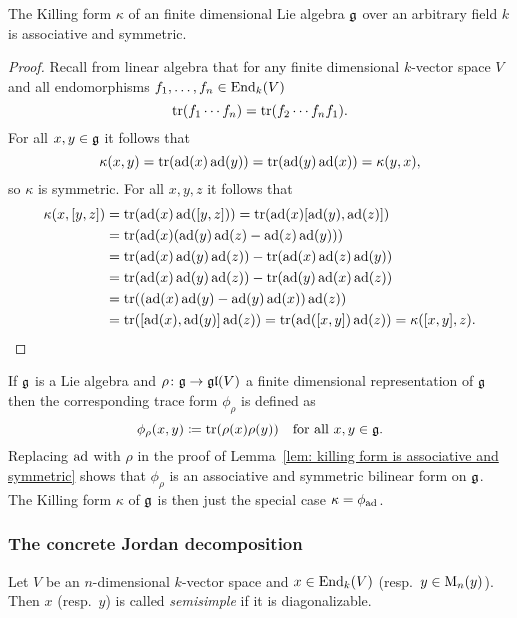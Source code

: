 \begin{lem}\label{lem: killing form is associative and symmetric}
 The Killing form $\kappa$ of an finite dimensional Lie algebra $\mathfrak{g}$ over an arbitrary field $k$ is associative and symmetric.
\end{lem}
\begin{proof}
 Recall from linear algebra that for any finite dimensional $k$-vector space $V$ and all endomorphisms $f_1, \dotsc, f_n \in \operatorname{End}_k(V)$
 \[
  \operatorname{tr}(f_1 \dotsm f_n) = \operatorname{tr}(f_2 \dotsm f_n f_1).
 \]
 For all $x,y \in \mathfrak{g}$ it follows that
 \[
  \kappa(x,y) = \operatorname{tr}(\operatorname{ad}(x) \operatorname{ad}(y)) = \operatorname{tr}(\operatorname{ad}(y) \operatorname{ad}(x)) = \kappa(y,x),
 \]
 so $\kappa$ is symmetric. For all $x,y,z$ it follows that
 \begin{align*}
  \kappa(x,[y,z])
  &= \operatorname{tr}(\operatorname{ad}(x) \operatorname{ad}([y,z]))
  = \operatorname{tr}(\operatorname{ad}(x) [\operatorname{ad}(y), \operatorname{ad}(z)]) \\
  &= \operatorname{tr}(\operatorname{ad}(x) (\operatorname{ad}(y) \operatorname{ad}(z) - \operatorname{ad}(z) \operatorname{ad}(y))) \\
  &= \operatorname{tr}(\operatorname{ad}(x) \operatorname{ad}(y) \operatorname{ad}(z)) - \operatorname{tr}(\operatorname{ad}(x) \operatorname{ad}(z) \operatorname{ad}(y)) \\
  &= \operatorname{tr}(\operatorname{ad}(x) \operatorname{ad}(y) \operatorname{ad}(z)) - \operatorname{tr}(\operatorname{ad}(y) \operatorname{ad}(x) \operatorname{ad}(z)) \\
  &= \operatorname{tr}((\operatorname{ad}(x) \operatorname{ad}(y)- \operatorname{ad}(y) \operatorname{ad}(x)) \operatorname{ad}(z)) \\
  &= \operatorname{tr}([\operatorname{ad}(x), \operatorname{ad}(y)] \operatorname{ad}(z))
  = \operatorname{tr}(\operatorname{ad}([x,y]) \operatorname{ad}(z))
  = \kappa([x,y],z).
 \qedhere
 \end{align*}
\end{proof}


\begin{rem}
 If $\mathfrak{g}$ is a Lie algebra and $\rho \colon \mathfrak{g} \to \mathfrak{gl}(V)$ a finite dimensional representation of $\mathfrak{g}$ then the corresponding trace form $\phi_\rho$ is defined as
 \[
  \phi_\rho(x,y) \coloneqq \operatorname{tr}(\rho(x) \rho(y)) \quad \text{for all $x,y \in \mathfrak{g}$}.
 \]
 Replacing $\operatorname{ad}$ with $\rho$ in the proof of Lemma~\ref{lem: killing form is associative and symmetric} shows that $\phi_\rho$ is an associative and symmetric bilinear form on $\mathfrak{g}$. The Killing form $\kappa$ of $\mathfrak{g}$ is then just the special case $\kappa = \phi_{\operatorname{ad}}$.
\end{rem}




\subsubsection{The concrete Jordan decomposition}


\begin{defi}
 Let $V$ be an $n$-dimensional $k$-vector space and $x \in \operatorname{End}_k(V)$ (resp.\ $y \in \operatorname{M}_n(y)$). Then $x$ (resp.\ $y$) is called \emph{semisimple} if it is diagonalizable.
\end{defi}


